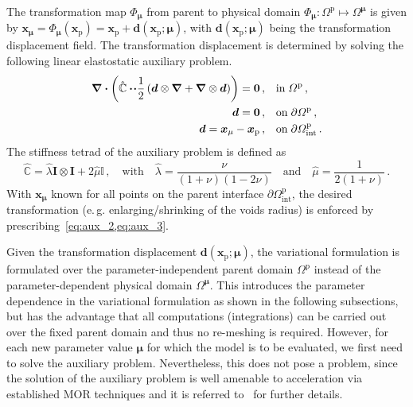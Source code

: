 \documentclass[a4paper]{eccomas_paper-2024}
\makeatletter
\newcommand{\eg}{e.\,g.\@\xspace}
\makeatother
\begin{document}
The transformation map $\Phi_{\bm\mu}$ from parent to physical domain $\Phi_{\bm\mu}: \varOmega^{\mathrm{p}}\mapsto\varOmega^{\bm\mu}$ is given by $\bm{x}_{\bm\mu}=\Phi_{\bm\mu}(\bm{x}_{\mathrm{p}}) = \bm{x}_{\mathrm{p}} + \bm{d}(\bm{x}_{\mathrm{p}}; \bm\mu)$, 
with $\bm{d}(\bm{x}_{\mathrm{p}}; \bm{\mu})$ being the transformation displacement field.
The transformation displacement is determined by solving the following linear elastostatic auxiliary problem.
\begin{align}
    \label{eq:aux_1}\div{\left(\hat{\mathbb{C}}\vdot\!\vdot\frac{1}{2}\left(
            \bm{d}\otimes\grad + \grad\otimes\bm{d}
\right)\right)}
            = \bm{0}\,,\quad&\mathrm{in}\;\varOmega^{\mathrm{p}}\,,\\
    \label{eq:aux_2}\bm{d} = \bm{0}\,,\quad&\mathrm{on}\;\partial\varOmega^{\mathrm{p}}\,,\\
    \label{eq:aux_3}\bm{d} = \bm{x}_{\mu} - \bm{x}_{\mathrm{p}}\,,\quad&\mathrm{on}\;\partial\varOmega^{\mathrm{p}}_{\mathrm{int}}\,.
\end{align}
The stiffness tetrad of the auxiliary problem is defined as
\begin{equation}
    \hat{\mathbb{C}} = \hat{\lambda} \bm{I}\otimes\bm{I} + 2\hat{\mu}\mathbb{I}\,,\quad\mathrm{with}\quad \hat{\lambda}=\frac{\nu}{(1+\nu)(1-2\nu)}\quad\mathrm{and}\quad\hat{\mu}=\frac{1}{2(1+\nu)}\,.
    \label{eq:aux_tetrad}
\end{equation}
With $\bm{x}_{\bm\mu}$ known for all points on the parent interface $\partial\varOmega^{\mathrm{p}}_{\mathrm{int}}$, the desired transformation (\eg{} enlarging/shrinking of the voids radius) is enforced by prescribing~\cref{eq:aux_2,eq:aux_3}.

Given the transformation displacement $\bm{d}(\bm{x}_{\mathrm{p}};\bm\mu)$, the variational formulation is formulated over the parameter-independent parent domain $\varOmega^{\mathrm{p}}$ instead of the parameter-dependent physical domain $\varOmega^{\bm\mu}$.
This introduces the parameter dependence in the variational formulation as shown in the following subsections, but has the advantage that all computations (integrations) can be carried out over the fixed parent domain and thus no re-meshing is required.
However, for each new parameter value $\bm\mu$ for which the model is to be evaluated, we first need to solve the auxiliary problem.
Nevertheless, this does not pose a problem, since the solution of the auxiliary problem is well amenable to acceleration via established MOR techniques and it is referred to~\cite{Guo2022Learning} for further details.
\end{document}

